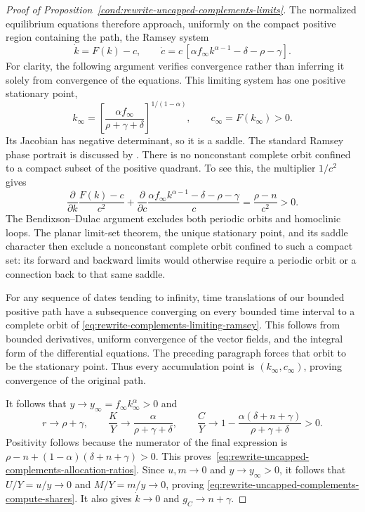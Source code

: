 \begin{proof}[Proof of Proposition~\ref{cond:rewrite-uncapped-complements-limits}]
The normalized equilibrium equations therefore approach, uniformly on
the compact positive region containing the path, the Ramsey system
\begin{equation}
 \dot k=F(k)-c,\qquad
 \dot c=c\,[\alpha f_\infty k^{\alpha-1}-\delta-\rho-\gamma].
 \label{eq:rewrite-complements-limiting-ramsey}
\end{equation}
For clarity, the following argument verifies convergence rather than
inferring it solely from convergence of the equations.
This limiting system has one positive stationary point,
\[
 k_\infty=
 \left[\frac{\alpha f_\infty}{\rho+\gamma+\delta}\right]^{1/(1-\alpha)},
 \qquad c_\infty=F(k_\infty)>0.
\]
Its Jacobian has negative determinant, so it is a saddle.
The standard Ramsey phase portrait is discussed by \citet{groth2013ramsey}.
There is no nonconstant complete orbit confined to a compact subset of
the positive quadrant. To see this, the multiplier $1/c^2$ gives
\[
 \frac{\partial}{\partial k}\frac{F(k)-c}{c^2}
 +\frac{\partial}{\partial c}
   \frac{\alpha f_\infty k^{\alpha-1}-\delta-\rho-\gamma}{c}
 =\frac{\rho-n}{c^2}>0.
\]
The Bendixson--Dulac argument excludes both periodic orbits and homoclinic
loops. The planar limit-set theorem, the unique stationary point, and its
saddle character then exclude a nonconstant complete orbit confined to
such a compact set: its forward and backward limits would otherwise
require a periodic orbit or a connection back to that same saddle.

For any sequence of dates tending to infinity, time translations of our
bounded positive path have a subsequence converging on every bounded
time interval to a complete orbit of
\eqref{eq:rewrite-complements-limiting-ramsey}. This follows from bounded
derivatives, uniform convergence of the vector fields, and the integral
form of the differential equations. The preceding paragraph forces that
orbit to be the stationary point. Thus every accumulation point is
$(k_\infty,c_\infty)$, proving convergence of the original path.

It follows that $y\to y_\infty=f_\infty k_\infty^\alpha>0$ and
\begin{equation}
 r\to\rho+\gamma,\qquad
 \frac KY\to\frac{\alpha}{\rho+\gamma+\delta},\qquad
 \frac CY\to1-\frac{\alpha(\delta+n+\gamma)}{\rho+\gamma+\delta}>0.
 \label{eq:rewrite-complements-euler-limit}
\end{equation}
Positivity follows because the numerator of the final expression is
$\rho-n+(1-\alpha)(\delta+n+\gamma)>0$.
This proves~\eqref{eq:rewrite-uncapped-complements-allocation-ratios}.
Since $u,m\to0$ and $y\to y_\infty>0$, it follows that
$U/Y=u/y\to0$ and $M/Y=m/y\to0$, proving
\eqref{eq:rewrite-uncapped-complements-compute-shares}.
It also gives $\dot k\to0$ and $g_C\to n+\gamma$.


\end{proof}
